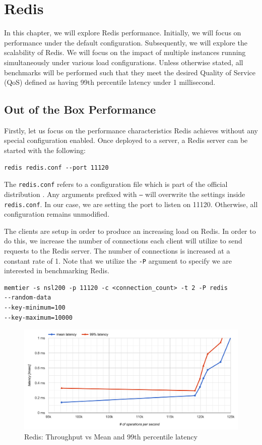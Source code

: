 \section{Redis}

In this chapter, we will explore Redis performance. Initially, we will focus on performance under the default configuration. Subsequently, we will explore the scalability of Redis. We will focus on the impact of multiple instances running simultaneously under various load configurations. Unless otherwise stated, all benchmarks will be performed such that they meet the desired Quality of Service (QoS) defined as having 99th percentile latency under 1 millisecond.

\subsection{Out of the Box Performance}
Firstly, let us focus on the performance characteristics Redis achieves without any special configuration enabled. Once deployed to a server, a Redis server can be started with the following:
\begin{lstlisting}
redis redis.conf --port 11120
\end{lstlisting}

The \texttt{redis.conf} refers to a configuration file which is part of the official distribution \cite{RedisConfiguration}. Any arguments prefixed with \texttt{--} will overwrite the settings inside \texttt{redis.conf}. In our case, we are setting the port to listen on 11120. Otherwise, all configuration remains unmodified.

The clients are setup in order to produce an increasing load on Redis. In order to do this, we increase the number of connections each client will utilize to send requests to the Redis server. The number of connections is increased at a constant rate of 1. Note that we utilize the \texttt{-P} argument to specify we are interested in benchmarking Redis.

\begin{lstlisting}
memtier -s nsl200 -p 11120 -c <connection_count> -t 2 -P redis
--random-data
--key-minimum=100
--key-maximum=10000
\end{lstlisting}

\begin{figure}[h]
    \includegraphics[width=\textwidth]{./res/6_default_latency_ops.png}
    \caption{Redis: Throughput vs Mean and 99th percentile latency}
    \label{fig:redis-default-latency-ops}
\end{figure}

